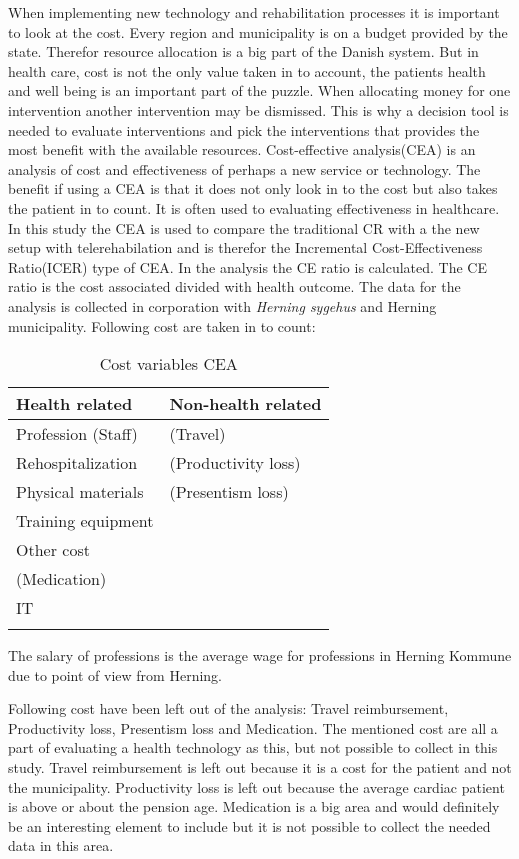 When implementing new technology and rehabilitation processes it is important to look at the cost. Every region and municipality is on a budget provided by the state. Therefor resource allocation is a big part of the Danish system. But in health care, cost is not the only value taken in to account, the patients health and well being is an important part of the puzzle. When allocating money for one intervention another intervention may be dismissed. This is why a decision tool is needed to evaluate interventions and pick the interventions that provides the most benefit with the available resources.
Cost-effective analysis(CEA) is an analysis of cost and effectiveness of perhaps a new service or technology. The benefit if using a CEA is that it does not only look in to the cost but also takes the patient in to count. It is often used to evaluating effectiveness in healthcare. In this study the CEA is used to compare the traditional CR with a the new setup with telerehabilation and is therefor the Incremental Cost-Effectiveness Ratio(ICER) type of CEA. In the analysis the CE ratio is calculated. The CE ratio is the cost associated divided with health outcome.
The data for the analysis is collected in corporation with \textit{Herning sygehus} and Herning municipality. 
Following cost are taken in to count:


\begin{longtabu} to 
	\textbf{Health related} & \textbf{Non-health related}\\[-1ex]
	\midrule
	Profession (Staff) & (Travel) \\[-1ex]
	Rehospitalization & (Productivity loss) \\[-1ex]
	Physical materials & (Presentism loss)\\[-1ex]
	Training equipment &  \\[-1ex]
	Other cost &  \\[-1ex]
	(Medication) &  \\[-1ex]
	IT &  \\[-1ex]
	\hline
	\caption{Cost variables CEA}
\end{longtabu}

The salary of professions is the average wage for professions in Herning Kommune due to point of view from Herning. 


Following cost have been left out of the analysis: Travel reimbursement, Productivity loss, Presentism loss and Medication. The mentioned cost are all a part of evaluating a health technology as this, but not possible to collect in this study. Travel reimbursement is left out because it is a cost for the patient and not the municipality. Productivity loss is left out because the average cardiac patient is above or about the pension age. Medication is a big area and would definitely be an interesting element to include but it is not possible to collect the needed data in this area. 


